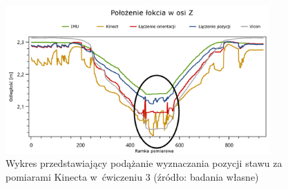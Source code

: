 \begin{figure}[!htb]
	\centering
	\includegraphics[width=0.9\textwidth]{images/300/Slide3_focus.png}
	\caption{Wykres przedstawiający podążanie wyznaczania pozycji stawu za pomiarami Kinecta w~ćwiczeniu 3 (źródło: badania własne)}
	\label{fig:experiments:sec:follow}
\end{figure}
